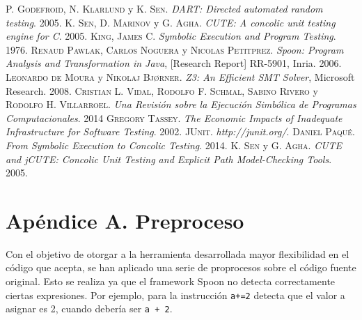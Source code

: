 \documentclass{llncs}
\begin{document}

\begin{thebibliography}{X}
 \textsc{P. Godefroid}, \textsc{N. Klarlund} y \textsc{K. Sen}. \textit{DART: Directed automated random testing}. 2005.
 \textsc{K. Sen}, \textsc{D. Marinov} y \textsc{G. Agha}. \textit{CUTE: A concolic unit testing engine for C}. 2005.
 \textsc{King, James C}. \textit{Symbolic Execution and Program Testing}. 1976.
 \textsc{Renaud Pawlak}, \textsc{Carlos Noguera} y \textsc{Nicolas Petitprez}. \textit{Spoon: Program Analysis and Transformation in Java}, [Research Report] RR-5901, Inria. 2006.
 \textsc{Leonardo de Moura} y \textsc{Nikolaj Bjørner}. \textit{Z3: An Efficient SMT Solver}, Microsoft Research. 2008.
 \textsc{Cristian L. Vidal}, \textsc{Rodolfo F. Schmal}, \textsc{Sabino Rivero} y \textsc{Rodolfo H. Villarroel}. \textit{Una Revisión sobre la Ejecución Simbólica de Programas Computacionales}. 2014
 \textsc{Gregory Tassey}. \textit{The Economic Impacts of Inadequate Infrastructure for Software Testing}. 2002.
 \textsc{JUnit}. \textit{http://junit.org/}.
 \textsc{Daniel Paqué}. \textit{From Symbolic Execution to  Concolic Testing}. 2014.
 \textsc{K. Sen} y \textsc{G. Agha}. \textit{CUTE and jCUTE: Concolic Unit Testing and Explicit Path Model-Checking Tools}. 2005.
\end{thebibliography}



\newpage
\appendix


\section*{Apéndice A. \enspace Preproceso}\label{apend.A}
Con el objetivo de otorgar a la herramienta desarrollada mayor flexibilidad en el código que acepta, se han aplicado una serie de proprocesos sobre el código fuente
original. Esto se realiza ya que el framework Spoon no detecta correctamente ciertas expresiones. Por ejemplo, para la instrucción \texttt{a+=2} detecta que el valor
a asignar es 2, cuando debería ser \texttt{a + 2}.
\end{document}
